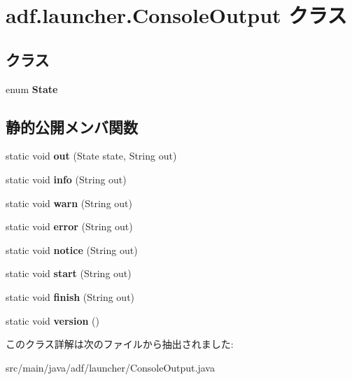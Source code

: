 \hypertarget{classadf_1_1launcher_1_1ConsoleOutput}{}\section{adf.\+launcher.\+Console\+Output クラス}
\label{classadf_1_1launcher_1_1ConsoleOutput}
\subsection*{クラス}
\begin{DoxyCompactItemize}
\item 
enum {\bfseries State}
\end{DoxyCompactItemize}
\subsection*{静的公開メンバ関数}
\begin{DoxyCompactItemize}
\item 
\hypertarget{classadf_1_1launcher_1_1ConsoleOutput_a489dce085b6f89ac2b703fcd966cb721}{}\label{classadf_1_1launcher_1_1ConsoleOutput_a489dce085b6f89ac2b703fcd966cb721} 
static void {\bfseries out} (State state, String out)
\item 
\hypertarget{classadf_1_1launcher_1_1ConsoleOutput_af98d7716ff42556c2e05d9574a65800b}{}\label{classadf_1_1launcher_1_1ConsoleOutput_af98d7716ff42556c2e05d9574a65800b} 
static void {\bfseries info} (String out)
\item 
\hypertarget{classadf_1_1launcher_1_1ConsoleOutput_ab0e6c05ce0706c70b485609765727071}{}\label{classadf_1_1launcher_1_1ConsoleOutput_ab0e6c05ce0706c70b485609765727071} 
static void {\bfseries warn} (String out)
\item 
\hypertarget{classadf_1_1launcher_1_1ConsoleOutput_aedb5bbfe8ed04f70ed1a68336e9eb4eb}{}\label{classadf_1_1launcher_1_1ConsoleOutput_aedb5bbfe8ed04f70ed1a68336e9eb4eb} 
static void {\bfseries error} (String out)
\item 
\hypertarget{classadf_1_1launcher_1_1ConsoleOutput_ad780ff9a8c8301c2589a1e127b87364d}{}\label{classadf_1_1launcher_1_1ConsoleOutput_ad780ff9a8c8301c2589a1e127b87364d} 
static void {\bfseries notice} (String out)
\item 
\hypertarget{classadf_1_1launcher_1_1ConsoleOutput_a268f0b3d9513f834dc4be545cc74c6fd}{}\label{classadf_1_1launcher_1_1ConsoleOutput_a268f0b3d9513f834dc4be545cc74c6fd} 
static void {\bfseries start} (String out)
\item 
\hypertarget{classadf_1_1launcher_1_1ConsoleOutput_aa24a2f065c7f578465d966304f992f57}{}\label{classadf_1_1launcher_1_1ConsoleOutput_aa24a2f065c7f578465d966304f992f57} 
static void {\bfseries finish} (String out)
\item 
\hypertarget{classadf_1_1launcher_1_1ConsoleOutput_a8ea55b53f57fa18caba623dd841fbac6}{}\label{classadf_1_1launcher_1_1ConsoleOutput_a8ea55b53f57fa18caba623dd841fbac6} 
static void {\bfseries version} ()
\end{DoxyCompactItemize}


このクラス詳解は次のファイルから抽出されました\+:\begin{DoxyCompactItemize}
\item 
src/main/java/adf/launcher/Console\+Output.\+java\end{DoxyCompactItemize}
